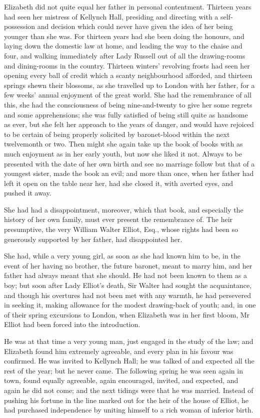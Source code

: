 Elizabeth did not quite equal her father in personal contentment. Thirteen years had seen her mistress of Kellynch Hall, presiding and directing with a self-possession and decision which could never have given the idea of her being younger than she was. For thirteen years had she been doing the honours, and laying down the domestic law at home, and leading the way to the chaise and four, and walking immediately after Lady Russell out of all the drawing-rooms and dining-rooms in the country. Thirteen winters' revolving frosts had seen her opening every ball of credit which a scanty neighbourhood afforded, and thirteen springs shewn their blossoms, as she travelled up to London with her father, for a few weeks' annual enjoyment of the great world. She had the remembrance of all this, she had the consciousness of being nine-and-twenty to give her some regrets and some apprehensions; she was fully satisfied of being still quite as handsome as ever, but she felt her approach to the years of danger, and would have rejoiced to be certain of being properly solicited by baronet-blood within the next twelvemonth or two. Then might she again take up the book of books with as much enjoyment as in her early youth, but now she liked it not. Always to be presented with the date of her own birth and see no marriage follow but that of a youngest sister, made the book an evil; and more than once, when her father had left it open on the table near her, had she closed it, with averted eyes, and pushed it away.

She had had a disappointment, moreover, which that book, and especially the history of her own family, must ever present the remembrance of. The heir presumptive, the very William Walter Elliot, Esq., whose rights had been so generously supported by her father, had disappointed her.

She had, while a very young girl, as soon as she had known him to be, in the event of her having no brother, the future baronet, meant to marry him, and her father had always meant that she should. He had not been known to them as a boy; but soon after Lady Elliot's death, Sir Walter had sought the acquaintance, and though his overtures had not been met with any warmth, he had persevered in seeking it, making allowance for the modest drawing-back of youth; and, in one of their spring excursions to London, when Elizabeth was in her first bloom, Mr Elliot had been forced into the introduction.

He was at that time a very young man, just engaged in the study of the law; and Elizabeth found him extremely agreeable, and every plan in his favour was confirmed. He was invited to Kellynch Hall; he was talked of and expected all the rest of the year; but he never came. The following spring he was seen again in town, found equally agreeable, again encouraged, invited, and expected, and again he did not come; and the next tidings were that he was married. Instead of pushing his fortune in the line marked out for the heir of the house of Elliot, he had purchased independence by uniting himself to a rich woman of inferior birth.


